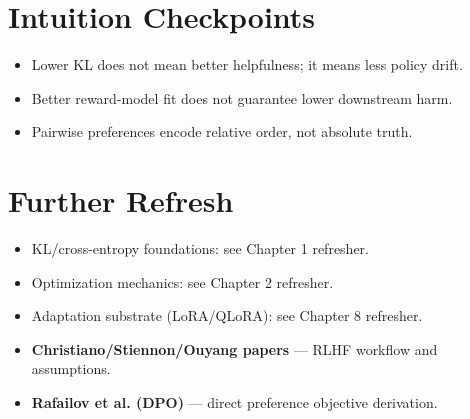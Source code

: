 \section*{Intuition Checkpoints}
\begin{itemize}[leftmargin=1.5em]
  \item Lower KL does not mean better helpfulness; it means less policy drift.
  \item Better reward-model fit does not guarantee lower downstream harm.
  \item Pairwise preferences encode relative order, not absolute truth.
\end{itemize}

\section*{Further Refresh}
\begin{itemize}[leftmargin=1.5em]
  \item KL/cross-entropy foundations: see Chapter 1 refresher.
  \item Optimization mechanics: see Chapter 2 refresher.
  \item Adaptation substrate (LoRA/QLoRA): see Chapter 8 refresher.
  \item \textbf{Christiano/Stiennon/Ouyang papers} --- RLHF workflow and assumptions.
  \item \textbf{Rafailov et al. (DPO)} --- direct preference objective derivation.
\end{itemize}
